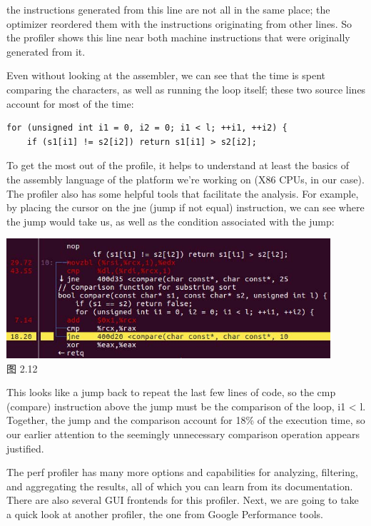 the instructions generated from this line are not all in the same place; the optimizer reordered them with the instructions originating from other lines. So the profiler shows this line near both machine instructions that were originally generated from it.

Even without looking at the assembler, we can see that the time is spent comparing the characters, as well as running the loop itself; these two source lines account for most of the time:

\begin{lstlisting}[style=styleCXX]
for (unsigned int i1 = 0, i2 = 0; i1 < l; ++i1, ++i2) {
	if (s1[i1] != s2[i2]) return s1[i1] > s2[i2];
\end{lstlisting}

To get the most out of the profile, it helps to understand at least the basics of the assembly language of the platform we're working on (X86 CPUs, in our case). The profiler also has some helpful tools that facilitate the analysis. For example, by placing the cursor on the jne (jump if not equal) instruction, we can see where the jump would take us, as well as the condition associated with the jump:

\begin{center}
\includegraphics[width=0.9\textwidth]{content/1/chapter2/images/12.jpg}\\
图 2.12
\end{center}

This looks like a jump back to repeat the last few lines of code, so the cmp (compare) instruction above the jump must be the comparison of the loop, i1 < l. Together, the jump and the comparison account for 18\% of the execution time, so our earlier attention to the seemingly unnecessary comparison operation appears justified.

The perf profiler has many more options and capabilities for analyzing, filtering, and aggregating the results, all of which you can learn from its documentation. There are also several GUI frontends for this profiler. Next, we are going to take a quick look at another profiler, the one from Google Performance tools.

